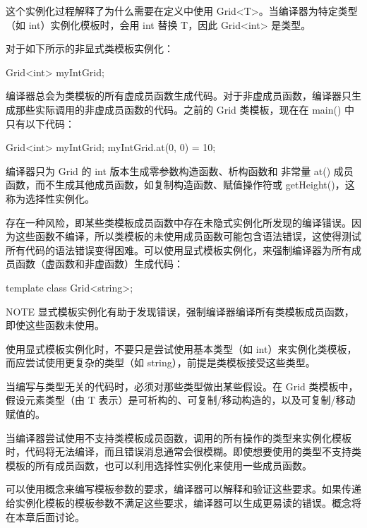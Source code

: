 这个实例化过程解释了为什么需要在定义中使用 Grid<T>。当编译器为特定类型（如 int）实例化模板时，会用 int 替换 T，因此 Grid<int> 是类型。


对于如下所示的非显式类模板实例化：

\begin{cpp}
Grid<int> myIntGrid;
\end{cpp}

编译器总会为类模板的所有虚成员函数生成代码。对于非虚成员函数，编译器只生成那些实际调用的非虚成员函数的代码。之前的 Grid 类模板，现在在 main() 中只有以下代码：

\begin{cpp}
Grid<int> myIntGrid;
myIntGrid.at(0, 0) = 10;
\end{cpp}

编译器只为 Grid 的 int 版本生成零参数构造函数、析构函数和 非常量 at() 成员函数，而不生成其他成员函数，如复制构造函数、赋值操作符或 getHeight()，这称为选择性实例化。


存在一种风险，即某些类模板成员函数中存在未隐式实例化所发现的编译错误。因为这些函数不编译，所以类模板的未使用成员函数可能包含语法错误，这使得测试所有代码的语法错误变得困难。可以使用显式模板实例化，来强制编译器为所有成员函数（虚函数和非虚函数）生成代码：

\begin{cpp}
template class Grid<string>;
\end{cpp}

\begin{myNotic}{NOTE}
显式模板实例化有助于发现错误，强制编译器编译所有类模板成员函数，即使这些函数未使用。
\end{myNotic}

使用显式模板实例化时，不要只是尝试使用基本类型（如 int）来实例化类模板，而应尝试使用更复杂的类型（如 string），前提是类模板接受这些类型。


当编写与类型无关的代码时，必须对那些类型做出某些假设。在 Grid 类模板中，假设元素类型（由 T 表示）是可析构的、可复制/移动构造的，以及可复制/移动赋值的。

当编译器尝试使用不支持类模板成员函数，调用的所有操作的类型来实例化模板时，代码将无法编译，而且错误消息通常会很模糊。即使想要使用的类型不支持类模板的所有成员函数，也可以利用选择性实例化来使用一些成员函数。

可以使用概念来编写模板参数的要求，编译器可以解释和验证这些要求。如果传递给实例化模板的模板参数不满足这些要求，编译器可以生成更易读的错误。概念将在本章后面讨论。

